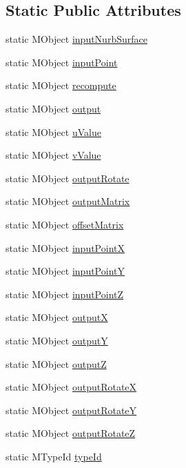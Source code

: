 \subsection*{Static Public Attributes}
\begin{DoxyCompactItemize}
\item 
static M\-Object \hyperlink{class_m_g__nurbs_rivet_a560023fd0f07e418f27f5a2fff70981c}{input\-Nurb\-Surface}
\item 
static M\-Object \hyperlink{class_m_g__nurbs_rivet_a29e50ce621268c3947f456f3e43bfa25}{input\-Point}
\item 
static M\-Object \hyperlink{class_m_g__nurbs_rivet_a7aeccbeeb51f51b5bef973f01103e6b9}{recompute}
\item 
static M\-Object \hyperlink{class_m_g__nurbs_rivet_ac3d5177a9758f3b3ad1b61cad032229e}{output}
\item 
static M\-Object \hyperlink{class_m_g__nurbs_rivet_a2531bc3b5ef7d7585fcf8a3b3435590e}{u\-Value}
\item 
static M\-Object \hyperlink{class_m_g__nurbs_rivet_a3ed59e29adcdbf204f407f08fe3b16b5}{v\-Value}
\item 
static M\-Object \hyperlink{class_m_g__nurbs_rivet_a446ab71986b82fe1e09210e5f467e010}{output\-Rotate}
\item 
static M\-Object \hyperlink{class_m_g__nurbs_rivet_a5dc9d6a6ed4f7e24425c3f25f934eead}{output\-Matrix}
\item 
static M\-Object \hyperlink{class_m_g__nurbs_rivet_a540b3de13a7788eec9d1c08973bb1515}{offset\-Matrix}
\item 
static M\-Object \hyperlink{class_m_g__nurbs_rivet_a5c09cb3fe1b1eb73e8f75176b8e7b723}{input\-Point\-X}
\item 
static M\-Object \hyperlink{class_m_g__nurbs_rivet_a9d55b7bdff71504f9531f8924cfc7d10}{input\-Point\-Y}
\item 
static M\-Object \hyperlink{class_m_g__nurbs_rivet_acd26e9adfc47fe51b82fe0f6c8ae9bb3}{input\-Point\-Z}
\item 
static M\-Object \hyperlink{class_m_g__nurbs_rivet_a4166483abd2b8b57483d81dbc97f3de5}{output\-X}
\item 
static M\-Object \hyperlink{class_m_g__nurbs_rivet_a9dacbb8116714802ee9eb28176a1e38c}{output\-Y}
\item 
static M\-Object \hyperlink{class_m_g__nurbs_rivet_a923a0bc4a7e64e2a6179e7d55cffd2a9}{output\-Z}
\item 
static M\-Object \hyperlink{class_m_g__nurbs_rivet_a55491d93e5402c09f4463e8729a83c57}{output\-Rotate\-X}
\item 
static M\-Object \hyperlink{class_m_g__nurbs_rivet_a36757fb01097b3063e8ab7e09d33b104}{output\-Rotate\-Y}
\item 
static M\-Object \hyperlink{class_m_g__nurbs_rivet_aa561c384be7c4fc5634436c491af7aef}{output\-Rotate\-Z}
\item 
static M\-Type\-Id \hyperlink{class_m_g__nurbs_rivet_a0d32f63265a10d14a34eb6a6e3c8a355}{type\-Id}
\end{DoxyCompactItemize}


